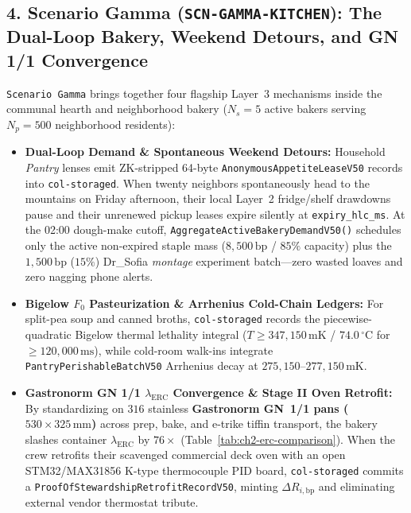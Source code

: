 \subsection{4. Scenario Gamma (\texttt{SCN-GAMMA-KITCHEN}): The Dual-Loop Bakery, Weekend Detours, and GN 1/1 Convergence}
\texttt{Scenario Gamma} brings together four flagship Layer~3 mechanisms inside the communal hearth and neighborhood bakery ($N_s = 5$ active bakers serving $N_p = 500$ neighborhood residents):
\begin{itemize}
    \item \textbf{Dual-Loop Demand \& Spontaneous Weekend Detours:} Household \textit{Pantry} lenses emit ZK-stripped 64-byte \texttt{AnonymousAppetiteLeaseV50} records into \texttt{col-storaged}. When twenty neighbors spontaneously head to the mountains on Friday afternoon, their local Layer~2 fridge/shelf drawdowns pause and their unrenewed pickup leases expire silently at \texttt{expiry\_hlc\_ms}. At the 02:00 dough-make cutoff, \texttt{AggregateActiveBakeryDemandV50()} schedules only the active non-expired staple mass ($8{,}500\,\mathrm{bp}$ / $85\%$ capacity) plus the $1{,}500\,\mathrm{bp}$ ($15\%$) Dr\_Sofia \textit{montage} experiment batch---zero wasted loaves and zero nagging phone alerts.
    \item \textbf{Bigelow $F_0$ Pasteurization \& Arrhenius Cold-Chain Ledgers:} For split-pea soup and canned broths, \texttt{col-storaged} records the piecewise-quadratic Bigelow thermal lethality integral ($T \ge 347{,}150\,\mathrm{mK}$ / $74.0\,^\circ\mathrm{C}$ for $\ge 120{,}000\,\mathrm{ms}$), while cold-room walk-ins integrate \texttt{PantryPerishableBatchV50} Arrhenius decay at $275{,}150\text{--}277{,}150\,\mathrm{mK}$.
    \item \textbf{Gastronorm GN 1/1 $\lambda_{\mathrm{ERC}}$ Convergence \& Stage II Oven Retrofit:} By standardizing on $316$ stainless \textbf{Gastronorm GN~1/1 pans ($530 \times 325\,\mathrm{mm}$)} across prep, bake, and e-trike tiffin transport, the bakery slashes container $\lambda_{\mathrm{ERC}}$ by $76\times$ (Table~\ref{tab:ch2-erc-comparison}). When the crew retrofits their scavenged commercial deck oven with an open STM32/MAX31856 K-type thermocouple PID board, \texttt{col-storaged} commits a \texttt{ProofOfStewardshipRetrofitRecordV50}, minting $\Delta R_{i,\mathrm{bp}}$ and eliminating external vendor thermostat tribute.
\end{itemize}

